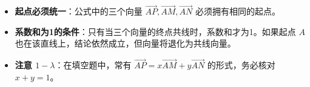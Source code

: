 \begin{trapbox}
\begin{itemize}
    \item \textbf{起点必须统一}：公式中的三个向量 $\vec{AP}, \vec{AM}, \vec{AN}$ 必须拥有相同的起点。
    \item \textbf{系数和为1的条件}：只有当三个向量的终点共线时，系数和才为1。如果起点 $A$ 也在该直线上，结论依然成立，但向量将退化为共线向量。
    \item \textbf{注意 $1-\lambda$}：在填空题中，常有 $\vec{AP} = x\vec{AM} + y\vec{AN}$ 的形式，务必核对 $x+y=1$。
\end{itemize}
\end{trapbox}